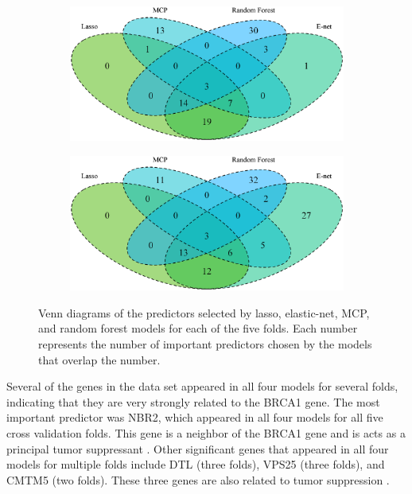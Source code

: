 \documentclass{article}
\begin{document}
\begin{figure}[h!]
\begin{subfigure}[b]{0.45\textwidth}
		\label{fig:venn3}
	\end{subfigure}
	\begin{subfigure}[b]{0.45\textwidth}
		\includegraphics[width=\textwidth]{images/venn/venn4.eps}
		\label{fig:venn4}
	\end{subfigure}
	\hspace{30pt}
	\begin{subfigure}[b]{0.45\textwidth}
		\includegraphics[width=\textwidth]{images/venn/venn5.eps}
		\label{fig:venn5}
	\end{subfigure}
	\captionsetup{width = 5in}
	\caption{Venn diagrams of the predictors selected by lasso, elastic-net, MCP, and random forest models for each of the five folds. Each number represents the number of important predictors chosen by the models that overlap the number.}
	\label{fig:venn}
\end{figure}

Several of the genes in the data set appeared in all four models for several folds, indicating that they are very strongly related to the BRCA1 gene. The most important predictor was NBR2, which appeared in all four models for all five cross validation folds. This gene is a neighbor of the BRCA1 gene and is acts as a principal tumor suppressant \cite{xiao2016nbr2}. Other significant genes that appeared in all four models for multiple folds include DTL (three folds), VPS25 (three folds), and CMTM5 (two folds). These three genes are also related to tumor suppression \cite{kobayashi2015overexpression, vaccari2005drosophila, shao2007cmtm5}.
\end{document}
